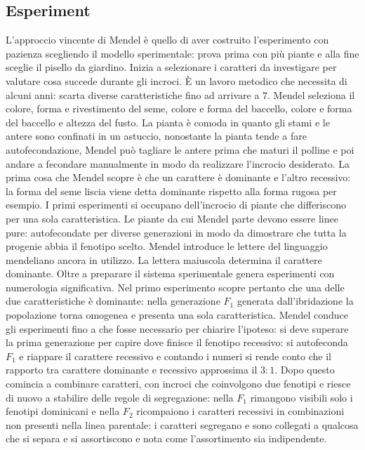 \subsection{Esperiment}
L'approccio vincente di Mendel \`e quello di aver costruito l'esperimento con pazienza scegliendo il modello sperimentale: prova prima con pi\`u piante e alla fine sceglie il pisello da 
giardino. Inizia a selezionare i caratteri da investigare per valutare cosa succede durante gli incroci. \`E un lavoro metodico che necessita di alcuni anni: scarta diverse 
caratteristiche fino ad arrivare a $7$. Mendel seleziona il colore, forma e rivestimento del seme, colore e forma del baccello, colore e forma del baccello e altezza del fusto. La pianta
\`e comoda in quanto gli stami e le antere sono confinati in un astuccio, nonostante la pianta tende a fare autofecondazione, Mendel pu\`o tagliare le antere prima che maturi il polline 
e poi andare a fecondare manualmente in modo da realizzare l'incrocio desiderato. La prima cosa che Mendel scopre \`e che un carattere \`e dominante e l'altro recessivo: la forma del 
seme liscia viene detta dominante rispetto alla forma rugosa per esempio. I primi esperimenti si occupano dell'incrocio di piante che differiscono per una sola caratteristica. Le piante 
da cui Mendel parte devono essere linee pure: autofecondate per diverse generazioni in modo da dimostrare che tutta la progenie abbia il fenotipo scelto. Mendel introduce le lettere del 
linguaggio mendeliano ancora in utilizzo. La lettera maiuscola determina il carattere dominante. Oltre a preparare il sistema sperimentale genera esperimenti con numerologia 
significativa. Nel primo esperimento scopre pertanto che una delle due caratteristiche \`e dominante: nella generazione $F_1$ generata dall'ibridazione la popolazione torna omogenea e 
presenta una sola caratteristica. Mendel conduce gli esperimenti fino a che fosse necessario per chiarire l'ipoteso: si deve superare la prima generazione per capire dove finisce il 
fenotipo recessivo: si autofeconda $F_1$ e riappare il carattere recessivo e contando i numeri si rende conto che il rapporto tra carattere dominante e recessivo approssima il $3:1$. 
Dopo questo comincia a combinare caratteri, con incroci che coinvolgono due fenotipi e riesce di nuovo a stabilire delle regole di segregazione: nella $F_1$ rimangono visibili solo i 
fenotipi dominicani e nella $F_2$ ricompaiono i caratteri recessivi in combinazioni non presenti nella linea parentale: i caratteri segregano e sono collegati a qualcosa che si separa e 
si assortiscono e nota come l'assortimento sia indipendente. 
